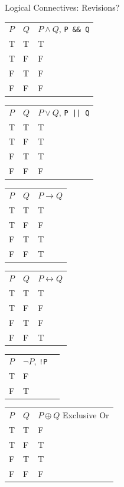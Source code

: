 \documentclass{beamer}
\begin{document}
\begin{frame}[fragile]{Logical Connectives: Revisions?}
  \begin{tabular}{|l|l|l|}
    \hline
   $P$ & $Q$ & $P \land Q$, \verb+P && Q+ \\
    T  & T   & T \\
    T  & F   & F \\
    F  & T   & F \\
    F  & F   & F \\
    \hline
  \end{tabular}
  \begin{tabular}{|l|l|l|}
    \hline
   $P$ & $Q$ & $P \lor Q$, \verb+P || Q+ \\
    T  & T   & T \\
    T  & F   & T \\
    F  & T   & T \\
    F  & F   & F \\
    \hline
  \end{tabular}

  \begin{tabular}{|l|l|l|}
    \hline
   $P$ & $Q$ & $P \rightarrow Q$ \\
    T  & T   & T \\
    T  & F   & F \\
    F  & T   & T \\
    F  & F   & T \\
    \hline
  \end{tabular}
  \begin{tabular}{|l|l|l|}
    \hline
   $P$ & $Q$ & $P \leftrightarrow Q$ \\
    T  & T   & T \\
    T  & F   & F \\
    F  & T   & F \\
    F  & F   & T \\
    \hline
  \end{tabular}
  \begin{tabular}{|l|l|l|}
    \hline
   $P$ & $\neg P$, \verb+!P+ \\
    T  & F \\
    F  & T \\
    \hline
  \end{tabular}

  \begin{tabular}{|l|l|l|}
    \hline
   $P$ & $Q$ & $P \oplus Q$ Exclusive Or \\
    T  & T   & F \\
    T  & F   & T \\
    F  & T   & T \\
    F  & F   & F \\
    \hline
  \end{tabular}
\end{frame}
\end{document}

